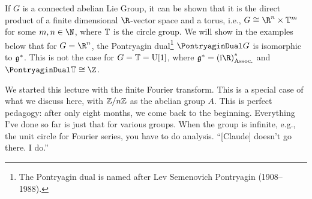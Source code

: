 \documentclass[10pt]{article}
\newcommand{\Rn}{{\R^n}}
\newenvironment{supplemental}{
\begin{mdframed}%
[hidealllines=true,                 %
  backgroundcolor=red!15!yellow!10  %
]}{\end{mdframed}}
\begin{document}
\begin{supplemental}
If $G$ is a connected abelian Lie Group, it can be shown that it is the direct product of a finite dimensional $\R$-vector space and a torus, i.e., $G\Isomorphic \Rn \DirectProduct \Torus m$ for some $m,n \in \N$, where $\mathbb{T}$ is the circle group.
We will show in the examples below that for $G=\Rn$, the Pontryagin dual\footnote{The Pontryagin dual is named after %
Lev Semenovich Pontryagin (1908--1988).} $\PontryaginDual G$ is isomorphic to $\mathfrak{g}^*$. This is not the case for $G=\CircleGroup=\UnitaryGroup\of1$, where $\MomentumSpace=\Dual{\pa{\I\R}}$ and $\PontryaginDual \CircleGroup \Isomorphic \Z$.
\endgroup
\end{supplemental}

We started this lecture with the finite Fourier transform. This is a special case of what we discuss here, with $\mathbb{Z} /{n}\mathbb{Z}$ as the abelian group $A$. This is perfect pedagogy: after only eight months, we come back to the beginning. Everything I've done so far is just that for various groups. When the group is infinite, e.g., the unit circle for Fourier series, you have to do analysis. ``[Claude] doesn't go there. I do.''
\end{document}
